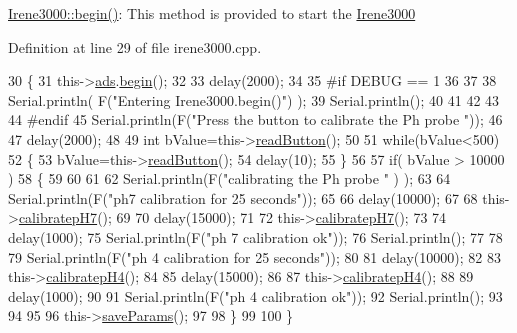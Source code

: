 \hyperlink{class_irene3000_ad5891806c500ae1007afe52b9e304c2b}{Irene3000\+::begin()}\+: This method is provided to start the \hyperlink{class_irene3000}{Irene3000} 

Definition at line 29 of file irene3000.\+cpp.


\begin{DoxyCode}
30 \{
31     this->\hyperlink{class_irene3000_a1215e77ba761c9908d80d691f149e135}{ads}.\hyperlink{class_adafruit___a_d_s1015_a6eba7c3cd854927f60883bb371e5faa6}{begin}();
32 
33     delay(2000);
34 
35 \textcolor{preprocessor}{#if DEBUG == 1 }
36 
37 
38     Serial.println( F(\textcolor{stringliteral}{"Entering Irene3000.begin()"}) );
39     Serial.println();
40     
41     
42     
43 
44 \textcolor{preprocessor}{#endif}
45     Serial.println(F(\textcolor{stringliteral}{"Press the button to calibrate the Ph probe "}));
46 
47     delay(2000);
48 
49     \textcolor{keywordtype}{int} bValue=this->\hyperlink{class_irene3000_a78a87eb7cf295b95c12b2ebd51c2bb77}{readButton}();
50     
51     \textcolor{keywordflow}{while}(bValue<500)
52     \{
53         bValue=this->\hyperlink{class_irene3000_a78a87eb7cf295b95c12b2ebd51c2bb77}{readButton}();
54         delay(10);  
55     \}
56 
57     \textcolor{keywordflow}{if}(  bValue > 10000 )
58     \{
59     
60 
61         
62         Serial.println(F(\textcolor{stringliteral}{"calibrating the Ph probe "} ) );
63         
64         Serial.println(F(\textcolor{stringliteral}{"ph7 calibration for 25 seconds"}));
65         
66         delay(10000);
67         
68         this->\hyperlink{class_irene3000_a1d3299202e4cb7afcff9c9e3e95d94c1}{calibratepH7}();
69 
70         delay(15000);       
71     
72         this->\hyperlink{class_irene3000_a1d3299202e4cb7afcff9c9e3e95d94c1}{calibratepH7}();
73 
74         delay(1000);
75         Serial.println(F(\textcolor{stringliteral}{"ph 7 calibration ok"}));
76         Serial.println();
77     
78 
79         Serial.println(F(\textcolor{stringliteral}{"ph 4 calibration for 25 seconds"}));
80     
81         delay(10000);       
82 
83         this->\hyperlink{class_irene3000_aa140dd026922a04981edfd04d46cabbe}{calibratepH4}();
84 
85         delay(15000);
86         
87         this->\hyperlink{class_irene3000_aa140dd026922a04981edfd04d46cabbe}{calibratepH4}();
88     
89         delay(1000);        
90 
91         Serial.println(F(\textcolor{stringliteral}{"ph 4 calibration ok"}));
92         Serial.println();
93     
94 
95 
96         this->\hyperlink{class_irene3000_a63dbd38e79b8cd5f1fba4b245501a894}{saveParams}();
97     
98     \}
99 
100 \}
\end{DoxyCode}
